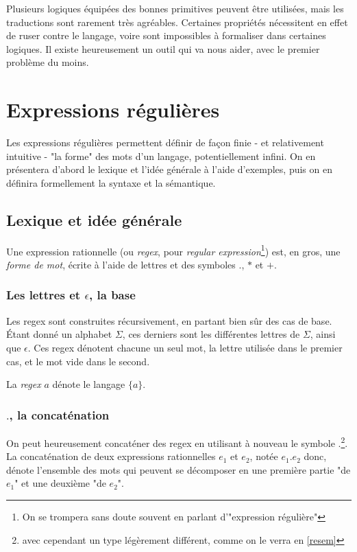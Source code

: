 Plusieurs logiques équipées des bonnes primitives peuvent être utilisées, mais les traductions sont rarement très agréables. Certaines propriétés nécessitent en effet de ruser contre le langage, voire sont impossibles à formaliser dans certaines logiques. Il existe heureusement un outil qui va nous aider, avec le premier problème du moins.

\chapter{Expressions régulières}
\label{regex}
Les expressions régulières permettent définir de façon finie - et relativement intuitive - "la forme" des mots d'un langage, potentiellement infini. On en présentera d'abord le lexique et l'idée générale à l'aide d'exemples, puis on en définira formellement la syntaxe et la sémantique.

\section{Lexique et idée générale}

Une expression rationnelle (ou \textit{regex}, pour \textit{regular expression}\footnote{On se trompera sans doute souvent en parlant d'"expression régulière"}) est, en gros, une \textit{forme de mot}, écrite à l'aide de lettres et des symboles $.$, $*$ et $+$.

\subsection{Les lettres et $\epsilon$, la base}

Les regex sont construites récursivement, en partant bien sûr des cas de base. Étant donné un alphabet $\Sigma$, ces derniers sont les différentes lettres de $\Sigma$, ainsi que $\epsilon$. Ces regex dénotent chacune un seul mot, la lettre utilisée dans le premier cas, et le mot vide dans le second.


\begin{example}
La \textit{regex} $a$ dénote le langage $\{a\}$.
\end{example}


\subsection{$.$, la concaténation}

On peut heureusement concaténer des regex en utilisant à nouveau le symbole $.$\footnote{avec cependant un type légèrement différent, comme on le verra en \ref{resem}}. La concaténation de deux expressions rationnelles $e_1$ et $e_2$, notée $e_1.e_2$ donc, dénote l'ensemble des mots qui peuvent se décomposer en une première partie "de $e_1$" et une deuxième "de $e_2$".

